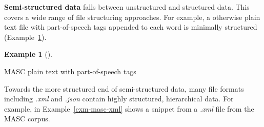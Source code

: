 \documentclass[
  letterpaper,
]{latex/krantz}
\newenvironment{Shaded}{\begin{snugshade}}{\end{snugshade}}
\newcommand{\NormalTok}[1]{\textcolor[rgb]{0.00,0.00,0.00}{#1}}
\theoremstyle{definition}
\newtheorem{example}{Example}[chapter]
\theoremstyle{remark}
\begin{document}
\textbf{Semi-structured data} falls between unstructured and structured
data. This covers a wide range of file structuring approaches. For
example, a otherwise plain text file with part-of-speech tags appended
to each word is minimally structured (Example~\ref{exm-masc-pos}).

\begin{example}[]\protect\hypertarget{exm-masc-pos}{}\label{exm-masc-pos}

MASC plain text with part-of-speech tags

\begin{Shaded}
\end{Shaded}

\end{example}

Towards the more structured end of semi-structured data, many file
formats including \emph{.xml} and \emph{.json} contain highly
structured, hierarchical data. For example, in
Example~\ref{exm-masc-xml} shows a snippet from a \emph{.xml} file from
the MASC corpus.
\end{document}
